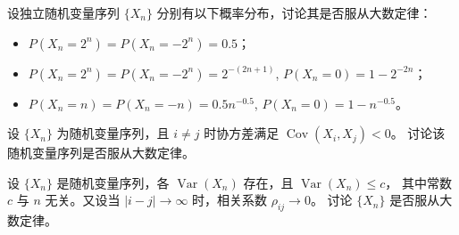 
\begin{homework}[5.7]
设独立随机变量序列 $\{X_n\}$ 分别有以下概率分布，讨论其是否服从大数定律：

\begin{itemize}
  \item[(1)] $P(X_n = 2^n)=P(X_n = -2^n)=0.5$；
  \item[(2)] $P(X_n = 2^n)=P(X_n = -2^n)=2^{-(2n+1)}$, 
              \quad $P(X_n=0)=1-2^{-2n}$；
  \item[(3)] $P(X_n = n)=P(X_n = -n)=0.5 n^{-0.5}$, 
              \quad $P(X_n=0)=1-n^{-0.5}$。
\end{itemize}
\end{homework}


\begin{homework}[5.8]
设 $\{X_n\}$ 为随机变量序列，且 $i\ne j$ 时协方差满足 $\operatorname{Cov}(X_i,X_j)<0$。
讨论该随机变量序列是否服从大数定律。
\end{homework}


\begin{homework}[5.9]
设 $\{X_n\}$ 是随机变量序列，各 $\operatorname{Var}(X_n)$ 存在，且 $\operatorname{Var}(X_n)\le c$，
其中常数 $c$ 与 $n$ 无关。又设当 $|i-j|\to\infty$ 时，相关系数 $\rho_{ij}\to 0$。
讨论 $\{X_n\}$ 是否服从大数定律。
\end{homework}
